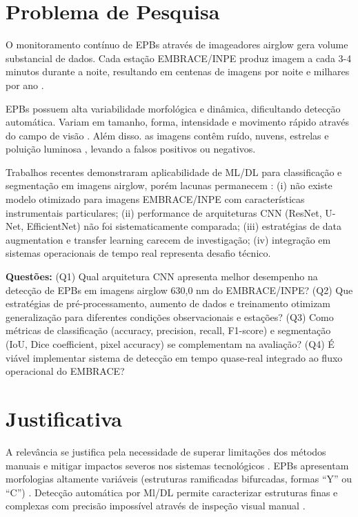 \documentclass[twocolumn]{article}
\begin{document}
\section{Problema de Pesquisa}

O monitoramento contínuo de EPBs através de imageadores airglow gera volume substancial de dados. Cada estação EMBRACE/INPE produz imagem a cada 3-4 minutos durante a noite, resultando em centenas de imagens por noite e milhares por ano \cite{Githio2024}.

EPBs possuem alta variabilidade morfológica e dinâmica, dificultando detecção automática. Variam em tamanho, forma, intensidade e movimento rápido através do campo de visão \cite{Githio2024}. Além disso. as imagens contêm ruído, nuvens, estrelas e poluição luminosa \cite{Siddiqui2025}, levando a falsos positivos ou negativos.

Trabalhos recentes demonstraram aplicabilidade de ML/DL para classificação e segmentação em imagens airglow, porém lacunas permanecem \cite{Githio2024}: (i) não existe modelo otimizado para imagens EMBRACE/INPE com características instrumentais particulares; (ii) performance de arquiteturas CNN (ResNet, U-Net, EfficientNet) não foi sistematicamente comparada; (iii) estratégias de data augmentation e transfer learning carecem de investigação; (iv) integração em sistemas operacionais de tempo real representa desafio técnico.

\textbf{Questões:} (Q1) Qual arquitetura CNN apresenta melhor desempenho na detecção de EPBs em imagens airglow 630,0 nm do EMBRACE/INPE? (Q2) Que estratégias de pré-processamento, aumento de dados e treinamento otimizam generalização para diferentes condições observacionais e estações? (Q3) Como métricas de classificação (accuracy, precision, recall, F1-score) e segmentação (IoU, Dice coefficient, pixel accuracy) se complementam na avaliação? (Q4) É viável implementar sistema de detecção em tempo quase-real integrado ao fluxo operacional do EMBRACE?

\section{Justificativa}

A relevância se justifica pela necessidade de superar limitações dos métodos manuais e mitigar impactos severos nos sistemas tecnológicos \cite{Githio2024}. EPBs apresentam morfologias altamente variáveis (estruturas ramificadas bifurcadas, formas ``Y'' ou ``C'') \cite{Githio2024}. Detecção automática por Ml/DL permite caracterizar estruturas finas e complexas com precisão impossível através de inspeção visual manual \cite{EMBRACE2021}.
\end{document}
